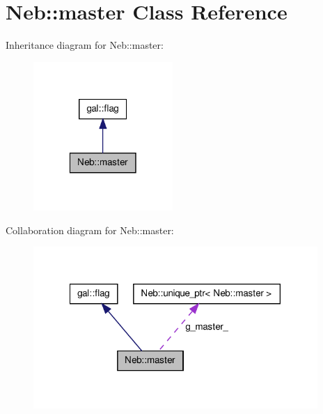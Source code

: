 \hypertarget{classNeb_1_1master}{\section{\-Neb\-:\-:master \-Class \-Reference}
\label{classNeb_1_1master}
}


\-Inheritance diagram for \-Neb\-:\-:master\-:\nopagebreak
\begin{figure}[H]
\begin{center}
\leavevmode
\includegraphics[width=150pt]{classNeb_1_1master__inherit__graph}
\end{center}
\end{figure}


\-Collaboration diagram for \-Neb\-:\-:master\-:\nopagebreak
\begin{figure}[H]
\begin{center}
\leavevmode
\includegraphics[width=306pt]{classNeb_1_1master__coll__graph}
\end{center}
\end{figure}
